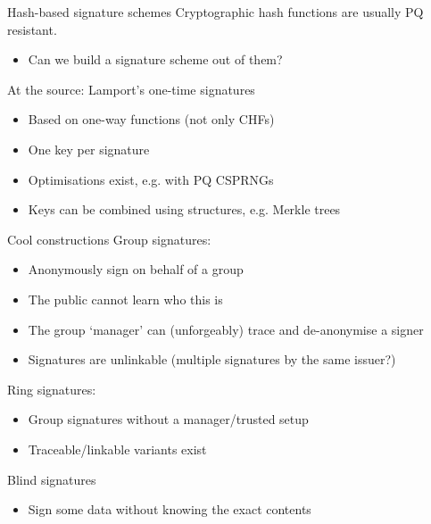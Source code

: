 \begin{frame}{Hash-based signature schemes}
  \pause
  Cryptographic hash functions are usually PQ resistant.
  \begin{itemize}
    \item Can we build a signature scheme out of them?
  \end{itemize}

  \vspace*{1em}

  \pause
  At the source: Lamport's one-time signatures
  \begin{itemize}[<+(1)->]
    \item Based on one-way functions (not only CHFs)
    \item One key per signature
    \item Optimisations exist, e.g. with PQ CSPRNGs
    \item Keys can be combined using structures, e.g. Merkle trees
  \end{itemize}
\end{frame}

\begin{frame}{Cool constructions}
  \pause
  Group signatures:
  \begin{itemize}[<+(1)->]
    \item Anonymously sign on behalf of a group
    \item The public cannot learn who this is
    \item The group `manager' can (unforgeably) trace and de-anonymise a signer
    \item Signatures are unlinkable (multiple signatures by the same issuer?)
  \end{itemize}

  \pause
  Ring signatures:
  \begin{itemize}[<+(1)->]
    \item Group signatures without a manager/trusted setup
    \item Traceable/linkable variants exist
  \end{itemize}

  \pause
  Blind signatures
  \begin{itemize}[<+(1)->]
    \item Sign some data without knowing the exact contents
  \end{itemize}
\end{frame}


